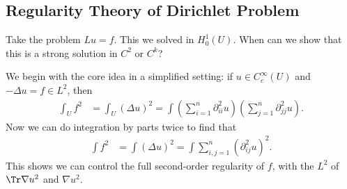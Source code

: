 \documentclass[12pt]{article}
\begin{document}
\subsection{Regularity Theory of Dirichlet Problem}%
\label{sub:rtp}

Take the problem $Lu = f$. This we solved in $H^1_0(U)$. When can we show that this is a strong solution in $C^2$ or $C^k$?

We begin with the core idea in a simplified setting: if $u \in C_c^\infty(U)$ and $-\Delta u = f \in L^2$, then 
\begin{align*}
	\int_U f^2 &= \int_U (\Delta u)^2 = \int \left( \sum_{i = 1}^n \partial_{ii}^2 u \right) \left( \sum_{j = 1}^n \partial_{jj}^2 u \right).
\end{align*}
Now we can do integration by parts twice to find that
\begin{align*}
	\int f^2 &= \int (\Delta u)^2 = \int \sum_{i,j = 1}^n (\partial_{ij}^2 u)^2.
\end{align*}
This shows we can control the full second-order regularity of $f$, with the $L^2$ of $\Tr \nabla u^2$ and $\nabla u^2$.


\newpage

\printindex
\end{document}

